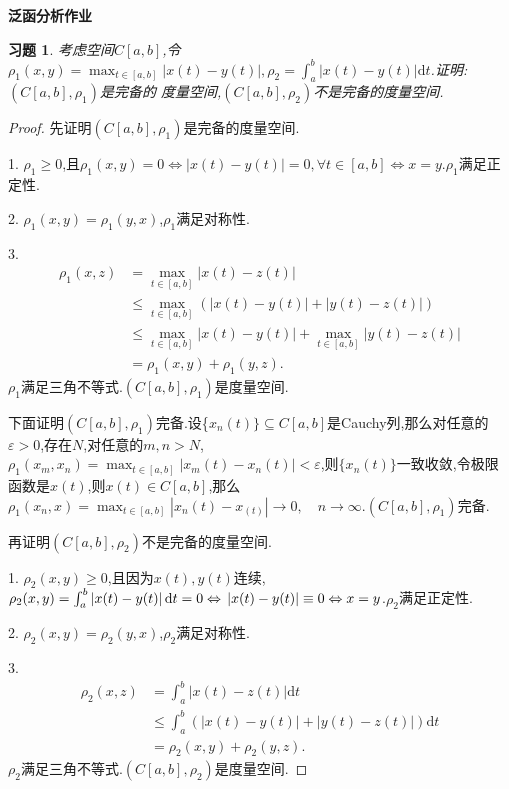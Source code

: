 \documentclass[a4paper,oneside,12pt]{ctexart}
\theoremstyle{plain}
\newtheorem{exercise}{习题}
\theoremstyle{nonumberplain}
\theoremstyle{nonumberplain}
\newtheorem{proof}{证明.}
\newcommand{\dif}{\mathrm{d}}
\renewcommand{\epsilon}{\varepsilon}
\newcommand{\abs}[1]{\left\vert#1\right\vert}
\begin{document}
    
\begin{center}
    \bfseries\LARGE
    泛函分析作业
\end{center}

\begin{exercise}
    \label{ex:1}
    考虑空间$C[a,b]$,令$\rho_1(x,y)=\max_{t\in[a,b]}\abs{x(t)-y(t)},\rho_2=\int_a^b\abs{x(t)-y(t)}\dif t$.证明:$(C[a,b],\rho_1)$是完备的
    度量空间,$(C[a,b],\rho_2)$不是完备的度量空间.
\end{exercise}

\begin{proof}
    先证明$(C[a,b],\rho_1)$是完备的度量空间.

    1. $\rho_1\geqslant 0$,且$\rho_1(x,y)=0\Leftrightarrow \abs{x(t)-y(t)}=0,\forall t\in[a,b]\Leftrightarrow x=y$.$\rho_1$满足正定性.

    2. $\rho_1(x,y)=\rho_1(y,x)$,$\rho_1$满足对称性.

    3. \begin{align*}
        \rho_1(x,z)&=\max_{t\in[a,b]}\abs{x(t)-z(t)}\\
        &\leqslant \max_{t\in[a,b]}(\abs{x(t)-y(t)}+\abs{y(t)-z(t)})\\
        &\leqslant \max_{t\in[a,b]} \abs{x(t)-y(t)}+\max_{t\in[a,b]}\abs{y(t)-z(t)}\\
        &=\rho_1(x,y)+\rho_1(y,z).
    \end{align*}
    $\rho_1$满足三角不等式.$(C[a,b],\rho_1)$是度量空间.

    下面证明$(C[a,b],\rho_1)$完备.设\{$x_n(t)\}\subseteq C[a,b]$是Cauchy列,那么对任意的$\epsilon>0$,存在$N$,对任意的$m,n>N$,
    $\rho_1(x_m,x_n)=\max_{t\in[a,b]}\abs{x_m(t)-x_n(t)}<\epsilon$,则$\{x_n(t)\}$一致收敛,令极限函数是$x(t)$,则$x(t)\in C[a,b]$,那么 
    $\rho_1(x_n,x)=\max_{t\in[a,b]}\abs{x_n(t)-x_(t)}\to 0,\quad n\to\infty$.$(C[a,b],\rho_1)$完备.

    再证明$(C[a,b],\rho_2)$不是完备的度量空间.

    1. $\rho_2(x,y)\geqslant 0$,且因为$x(t),y(t)$连续,$\rho_2(x,y)=\int_a^b\abs{x(t)-y(t)}\dif t=0\Leftrightarrow \\\abs{x(t)-y(t)}
    \equiv 0\Leftrightarrow x=y$.$\rho_2$满足正定性.

    2. $\rho_2(x,y)=\rho_2(y,x)$,$\rho_2$满足对称性.

    3. \begin{align*}
        \rho_2(x,z)&=\int_a^b\abs{x(t)-z(t)}\dif t\\
        &\leqslant \int_a^b(\abs{x(t)-y(t)}+\abs{y(t)-z(t)})\dif t\\
        &=\rho_2(x,y)+\rho_2(y,z).
    \end{align*}
    $\rho_2$满足三角不等式.$(C[a,b],\rho_2)$是度量空间.


\end{proof}
\end{document}
